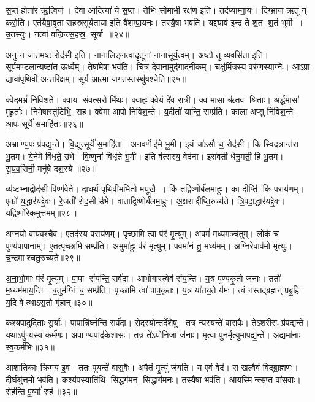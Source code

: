 स॒प्त होता॑र ऋ॒त्विज॑। देवा आदित्या॑ ये स॒प्त। 
तेभिः सोमाभी रक्ष॑ण इ॒ति। तद॑प्याम्ना॒यः। 
दिग्भ्राज ऋतून्‌ करो॒ति। एत॑यैवा॒वृता सहस्रसूर्यताया इति वै॑शम्पा॒यनः। 
तस्यै॒षा भव॑ति। यद्द्याव॑ इन्द्र ते श॒त श॒तं भूमी। 
उ॒तस्युः। नत्वा॑ वज्रिन्त्स॒हस्र॒ सूर्या॥२४॥

अनु न जातमष्ट रोद॑सी इ॒ति। नानालिङ्गत्वादृतूनां नाना॑सूर्य॒त्वम्। 
अष्टौ तु व्यवसि॑ता इ॒ति। सूर्यमण्डलान्यष्टा॑त ऊ॒र्ध्वम्‌। 
तेषा॑मेषा॒ भव॑ति। चि॒त्रं दे॒वाना॒मुद॑गा॒दनी॑कम्। 
चक्षु॑र्मि॒त्रस्य॒ वरु॑णस्या॒ग्नेः। आऽप्रा॒ द्यावा॑पृथि॒वी अ॒न्तरि॑क्षम्। 
सूर्य आत्मा जगतस्तस्थु॑षश्चे॒ति॥२५॥\anuvakamend


क्वेदमभ्रं॑ निवि॒शते। क्वाय संवत्स॒रो मि॑थः। 
क्वाहः क्वेयं दे॑व रा॒त्री। क्व मासा ऋ॑तव॒ श्रिताः। 
अर्द्धमासा॑ मुहू॒र्ताः। निमेषास्तु॑टिभि॒ सह। 
क्वेमा आपो नि॑विश॒न्ते। य॒दीतो॑ यान्ति॒ सम्प्र॑ति। 
काला अप्सु नि॑विश॒न्ते। आ॒पः सूर्ये॑ स॒माहि॑ताः॥२६॥

अभ्राण्य॒पः प्र॑पद्य॒न्ते। वि॒द्युत्सूर्ये॑ स॒माहि॑ता। 
अनवर्णे इ॑मे भू॒मी। इ॒यं चा॑ऽसौ च॒ रोद॑सी। 
किस्विदत्रान्त॑रा भू॒तम्। ये॒नेमे वि॑धृते॒ उभे। 
वि॒ष्णुना॑ विधृ॑ते भू॒मी। इ॒ति व॑त्सस्य॒ वेद॑ना। 
इरा॑वती धेनु॒मती॒ हि भू॒तम्‌। सू॒य॒व॒सिनी॒ मनु॑षे दश॒स्ये॥२७॥

व्य॑ष्टभ्ना॒द्रोद॑सी॒ विष्ण॑वे॒ते। दा॒धर्थ॑ पृथि॒वीम॒भितो॑ म॒यूखै। 
किं तद्विष्णोर्ब॑ल\-मा॒हुः। का॒ दीप्ति॑ किं प॒राय॑णम्‌। 
एको॑ य॒द्धार॑यद्दे॒वः। रे॒जती॑ रोद॒सी उ॑भे। 
वाताद्विष्णोर्ब॑लमा॒हुः। अ॒क्षराद्दीप्ति॒रुच्य॑ते। 
त्रि॒पदा॒द्धार॑यद्दे॒वः। यद्विष्णो॑रेक॒मुत्त॑मम्‌॥२८॥

अ॒ग्नयो॑ वाय॑वश्चै॒व। ए॒तद॑स्य प॒राय॑णम्‌। 
पृच्छामि त्वा प॑रं मृ॒त्युम्‌। अ॒वमं॑ मध्य॒मञ्च॑तुम्‌। 
लो॒कं च॒ पुण्य॑पापा॒नाम्‌। ए॒तत्पृ॑च्छामि॒ सम्प्र॑ति। 
अ॒मुमा॑हुः प॑रं मृ॒त्युम्‌। प॒वमा॑नं तु॒ मध्य॑मम्‌। 
अ॒ग्निरे॒वाव॑मो मृ॒त्युः। च॒न्द्रमाश्चतु॒रुच्य॑ते॥२९॥

अ॒ना॒भो॒गाः प॑रं मृ॒त्युम्‌। पा॒पा सं॑यन्ति॒ सर्व॑दा। 
आभोगास्त्वेव॑ संय॒न्ति। य॒त्र पु॑ण्यकृ॒तो ज॑नाः। 
ततो॑ म॒ध्यम॑माय॒न्ति। च॒तुम॑ग्निं च॒ सम्प्र॑ति। 
पृच्छामि त्वा॑ पाप॒कृतः। य॒त्र या॑तय॒ते य॑मः। 
त्वं नस्तद्ब्रह्म॑न्‌ प्रब्रू॒हि। य॒दि वेत्थाऽस॒तो गृ॑हान्‌॥३०॥

क॒श्यपा॑दुदि॑ताः सू॒र्याः। पा॒पान्नि॑र्घ्नन्ति॒ सर्व॑दा। 
रोदस्योन्त॑र्दे\-शे॒षु। तत्र न्यस्यन्ते॑ वास॒वैः। 
तेऽशरीराः प्र॑पद्य॒न्ते। य॒थाऽपु॑ण्यस्य॒ कर्म॑णः। 
अपाण्य॒पाद॑केशा॒सः। त॒त्र ते॑ऽयोनि॒जा ज॑नाः। 
मृत्वा पुनर्मृत्युमा॑पद्य॒न्ते। अ॒द्यमा॑नाः स्व॒कर्म॑भिः॥३१॥

आशातिकाः क्रिम॑य इ॒व। ततः पूयन्ते॑ वास॒वैः। अपै॑तं मृ॒त्युं ज॑यति। 
य ए॒वं वेद॑। स खल्वैवं॑ विद्ब्रा॒ह्मणः। दी॒र्घश्रु॑त्तमो॒ भव॑ति। 
कश्य॑प॒स्याति॑थि॒ सिद्धग॑मन॒ सिद्धाग॑मनः। तस्यै॒षा भव॑ति। 
आयस्मिन्त्स॒प्त वा॑स॒वाः। रोह॑न्ति पू॒र्व्या॑ रुह॑॥३२॥

